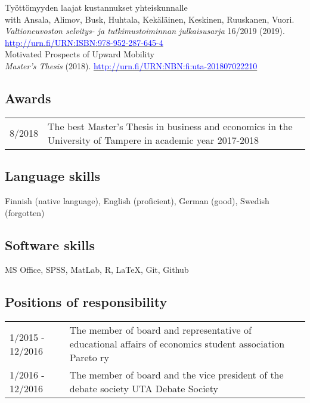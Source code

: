 \documentclass[16pt]{article}
\begin{document}
\noindent Ty\"{o}tt\"{o}myyden laajat kustannukset yhteiskunnalle \\
\noindent with Ansala, Alimov, Busk, Huhtala, Kek\"{a}l\"{a}inen, Keskinen, Ruuskanen, Vuori.  \textit{Valtioneuvoston selvitys- ja tutkimustoiminnan julkaisusarja} 16/2019 (2019). \href{http://urn.fi/URN:ISBN:978-952-287-645-4}{\textcolor{blue}{http://urn.fi/URN:ISBN:978-952-287-645-4}} \\

\noindent Motivated Prospects of Upward Mobility \\
\noindent \textit{Master's Thesis} (2018). \href{http://urn.fi/URN:NBN:fi:uta-201807022210}{\textcolor{blue}{http://urn.fi/URN:NBN:fi:uta-201807022210}}

\subsection*{Awards} 
\begin{tabular}{@{}p{1.5in}p{5in}}
8/2018           & The best Master's Thesis in business and economics in the University of Tampere in academic year 2017-2018 \\


\end{tabular}

\subsection*{Language skills}
Finnish (native language), English (proficient), German (good), Swedish (forgotten)

\subsection*{Software skills}
MS Office, SPSS, MatLab, R, \LaTeX, Git, Github

\subsection*{Positions of responsibility}
\begin{tabular}{@{}p{1.5in}p{5in}}
1/2015 - 12/2016 & The member of board and representative of educational affairs of economics student association Pareto ry\\
1/2016 - 12/2016 & The member of board and the vice president of the debate society UTA Debate Society\\
\end{tabular}
\end{document}
